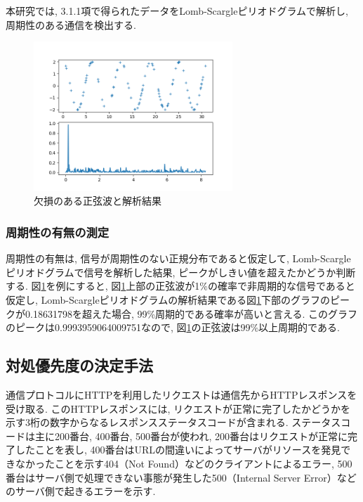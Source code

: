 \documentclass[twocolumn,9pt]{ltjsarticle}
\begin{document}
本研究では, 3.1.1項で得られたデータをLomb-Scargleピリオドグラムで解析し, 周期性のある通信を検出する. 

\begin{figure}[htbp]
    \centering

    \includegraphics[width=7.5cm]{images/【実験】LombScargleピリオドグラムによるShinoBot通信の解析/lombscargle.png}

    \caption{欠損のある正弦波と解析結果}
    \label{fig:lombscargle}
\end{figure}

\subsubsection{周期性の有無の測定}
周期性の有無は, 信号が周期性のない正規分布であると仮定して, Lomb-Scargleピリオドグラムで信号を解析した結果, ピークがしきい値を超えたかどうか判断する. 図\ref{fig:lombscargle}を例にすると, 図\ref{fig:lombscargle}上部の正弦波が1\%の確率で非周期的な信号であると仮定し, Lomb-Scargleピリオドグラムの解析結果である図\ref{fig:lombscargle}下部のグラフのピークが0.18631798を超えた場合, 99\%周期的である確率が高いと言える. このグラフのピークは0.9993959064009751なので, 図\ref{fig:lombscargle}の正弦波は99\%以上周期的である. 

\subsection{対処優先度の決定手法}
通信プロトコルにHTTPを利用したリクエストは通信先からHTTPレスポンスを受け取る. このHTTPレスポンスには, リクエストが正常に完了したかどうかを示す3桁の数字からなるレスポンスステータスコードが含まれる. ステータスコードは主に200番台, 400番台, 500番台が使われ, 200番台はリクエストが正常に完了したことを表し, 400番台はURLの間違いによってサーバがリソースを発見できなかったことを示す404（Not Found）などのクライアントによるエラー, 500番台はサーバ側で処理できない事態が発生した500（Internal Server Error）などのサーバ側で起きるエラーを示す. 
\end{document}

